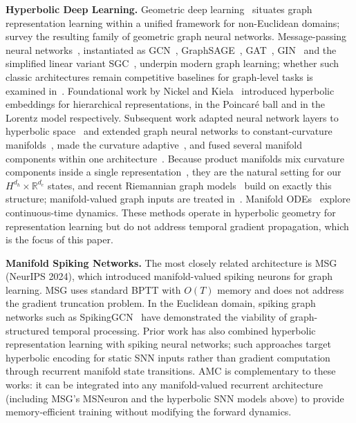 \documentclass[a4paper,fleqn]{cas-dc}
\begin{document}
\textbf{Hyperbolic Deep Learning.} Geometric deep learning~\citep{Bronstein17,Bronstein21} situates graph representation learning within a unified framework for non-Euclidean domains;~\citet{Han25Survey} survey the resulting family of geometric graph neural networks. Message-passing neural networks~\citep{Gilmer17}, instantiated as GCN~\citep{Kipf17}, GraphSAGE~\citep{Hamilton17}, GAT~\citep{Velickovic18}, GIN~\citep{Xu19} and the simplified linear variant SGC~\citep{Wu19SGC}, underpin modern graph learning; whether such classic architectures remain competitive baselines for graph-level tasks is examined in~\citep{Luo25}. Foundational work by Nickel and Kiela~\citep{Nickel17,Nickel18Lorentz} introduced hyperbolic embeddings for hierarchical representations, in the Poincar\'e ball and in the Lorentz model respectively. Subsequent work adapted neural network layers to hyperbolic space~\citep{Ganea18,Mathieu19} and extended graph neural networks to constant-curvature manifolds~\citep{Chami19,Liu19,Bachmann20}, made the curvature adaptive~\citep{Fu21ACEHGNN,Fu23Hyperbolic}, and fused several manifold components within one architecture~\citep{Deng23FMGNN}. Because product manifolds mix curvature components inside a single representation~\citep{Gu19Product,Skopek20,McNeela25}, they are the natural setting for our $H^{d_h} \times \mathbb{R}^{d_e}$ states, and recent Riemannian graph models~\citep{Sun24RMGN,Sun25RiemannGFM} build on exactly this structure; manifold-valued graph inputs are treated in~\citep{Hanik25ManifoldGCN}. Manifold ODEs~\citep{Lou20} explore continuous-time dynamics. These methods operate in hyperbolic geometry for representation learning but do not address temporal gradient propagation, which is the focus of this paper.

\textbf{Manifold Spiking Networks.} The most closely related architecture is MSG~\citep{Sun24MSG} (NeurIPS 2024), which introduced manifold-valued spiking neurons for graph learning. MSG uses standard BPTT with $O(T)$ memory and does not address the gradient truncation problem. In the Euclidean domain, spiking graph networks such as SpikingGCN~\citep{Zhu22} have demonstrated the viability of graph-structured temporal processing. Prior work has also combined hyperbolic representation learning with spiking neural networks; such approaches target hyperbolic encoding for static SNN inputs rather than gradient computation through recurrent manifold state transitions. AMC is complementary to these works: it can be integrated into any manifold-valued recurrent architecture (including MSG's MSNeuron and the hyperbolic SNN models above) to provide memory-efficient training without modifying the forward dynamics.
\end{document}

